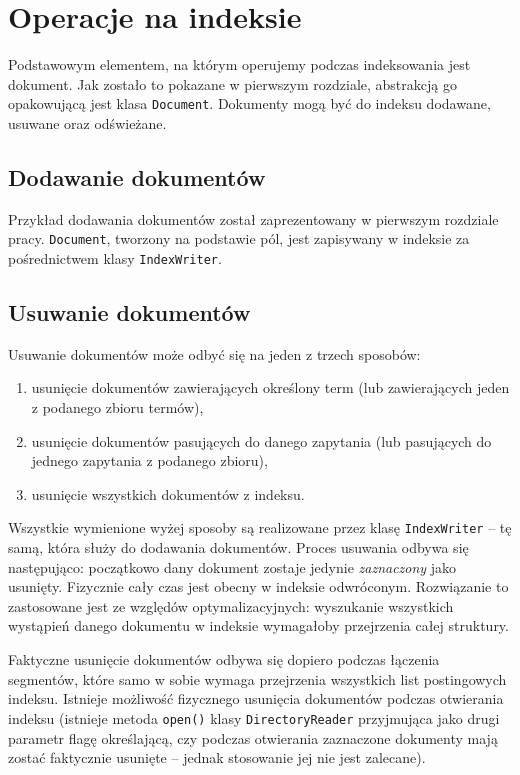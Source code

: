 \section{Operacje na indeksie}

Podstawowym elementem, na którym operujemy podczas indeksowania jest dokument. Jak zostało to pokazane w pierwszym rozdziale, abstrakcją go opakowującą jest klasa \texttt{Document}. Dokumenty mogą być do indeksu dodawane, usuwane oraz odświeżane.

\subsection{Dodawanie dokumentów}

Przykład dodawania dokumentów został zaprezentowany w pierwszym rozdziale pracy. \texttt{Document}, tworzony na podstawie pól, jest zapisywany w indeksie za pośrednictwem klasy \texttt{IndexWriter}.

\subsection{Usuwanie dokumentów}

Usuwanie dokumentów może odbyć się na jeden z trzech sposobów: 
\begin{enumerate}
 \item usunięcie dokumentów zawierających określony term (lub zawierających jeden z podanego zbioru termów),
 \item usunięcie dokumentów pasujących do danego zapytania (lub pasujących do jednego zapytania z podanego zbioru),
 \item usunięcie wszystkich dokumentów z indeksu.
\end{enumerate}

Wszystkie wymienione wyżej sposoby są realizowane przez klasę \texttt{IndexWriter} -- tę samą, która służy do dodawania dokumentów. Proces usuwania odbywa się następująco: początkowo dany dokument zostaje jedynie \emph{zaznaczony} jako usunięty. Fizycznie cały czas jest obecny w indeksie odwróconym. Rozwiązanie to zastosowane jest ze względów optymalizacyjnych: wyszukanie wszystkich wystąpień danego dokumentu w indeksie wymagałoby przejrzenia całej struktury. 

Faktyczne usunięcie dokumentów odbywa się dopiero podczas łączenia segmentów, które samo w sobie wymaga przejrzenia wszystkich list postingowych indeksu. Istnieje możliwość fizycznego usunięcia dokumentów podczas otwierania indeksu (istnieje metoda \texttt{open()} klasy \texttt{DirectoryReader} przyjmująca jako drugi parametr flagę określającą, czy podczas otwierania zaznaczone dokumenty mają zostać faktycznie usunięte -- jednak stosowanie jej nie jest zalecane).

